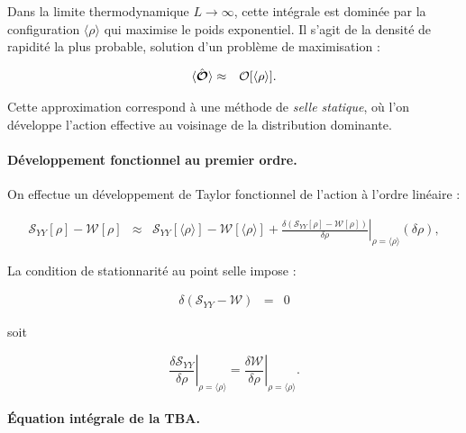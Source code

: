 Dans la limite thermodynamique \( L \to \infty \), cette intégrale est dominée par la configuration \( \langle \rho \rangle \) qui maximise le poids exponentiel. Il s’agit de la densité de rapidité la plus probable, solution d’un problème de maximisation :


\begin{eqnarray}
	\langle \hat{\bm{\mathcal{O}}} \rangle & \approx & \mathcal{O}[\langle \rho \rangle ].	
	\label{chap:TBA:eq:ensemble_average:approx}
\end{eqnarray}

Cette approximation correspond à une méthode de \textit{selle statique}, où l’on développe l’action effective au voisinage de la distribution dominante.


\paragraph{Développement fonctionnel au premier ordre.}

On effectue un développement de Taylor fonctionnel de l'action à l’ordre linéaire :

\begin{eqnarray*}
	\mathcal{S}_{YY}[\rho] - \mathcal{W}[\rho] & \approx & \mathcal{S}_{YY}[\langle\rho\rangle] - \mathcal{W}[\langle\rho\rangle] +  \left. \frac{\delta (\mathcal{S}_{YY}[\rho] - \mathcal{W}[\rho]) }{\delta \rho} \right|_{\rho = \langle \rho \rangle }	(\delta \rho),
	\label{chap:TBA:eq:action}	
\end{eqnarray*}	


La condition de stationnarité au point selle impose :

\begin{eqnarray*}
	\delta (\mathcal{S}_{YY} - \mathcal{W}) & = & 0  	
\end{eqnarray*}

soit 

\begin{equation}
\left. \frac{\delta \mathcal{S}_{YY}}{\delta \rho} \right|_{\rho = \langle \rho \rangle} = \left. \frac{\delta \mathcal{W}}{\delta \rho} \right|_{\rho = \langle \rho \rangle}.
\end{equation}

\paragraph{Équation intégrale de la TBA.}

